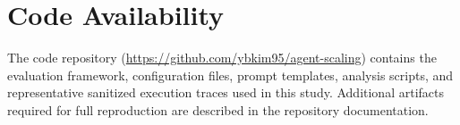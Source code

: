 \documentclass[11pt, a4paper, logo, copyright]{googledeepmind}
\begin{document}
\section*{Code Availability}

The code repository (\url{https://github.com/ybkim95/agent-scaling}) contains the evaluation framework, configuration files, prompt templates, analysis scripts, and representative sanitized execution traces used in this study. Additional artifacts required for full reproduction are described in the repository documentation.
\newpage


\end{document}
